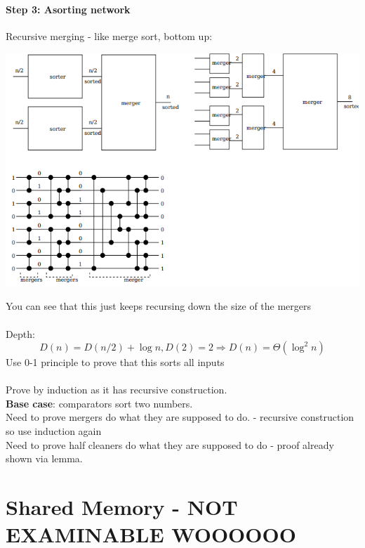 \documentclass{article}[18pt]
\begin{document}
\paragraph{Step 3: Asorting network}
Recursive merging - like merge sort, bottom up:
\begin{center}
	\includegraphics[scale=0.8]{AsortingNetwork}
\end{center}
You can see that this just keeps recursing down the size of the mergers\\
\\
Depth:
$$D(n)=D(n/2)+\log n, D(2)=2 \Rightarrow D(n)=\Theta(\log^2 n)$$
Use 0-1 principle to prove that this sorts all inputs\\
\\
Prove by induction as it has recursive construction.\\
\textbf{Base case}: comparators sort two numbers.\\
Need to prove mergers do what they are supposed to do. - recursive construction so use induction again\\
Need to prove half cleaners do what they are supposed to do - proof already shown via lemma.\\
\section{Shared Memory - NOT EXAMINABLE WOOOOOO}
\end{document}
